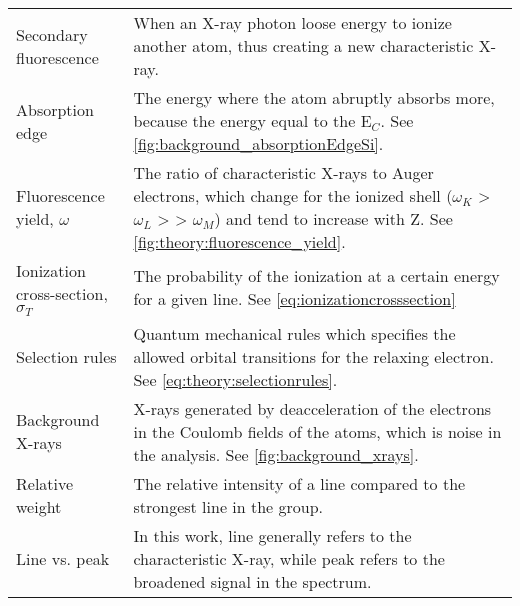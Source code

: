 \begin{table}[phb]
\begin{center}
\begin{tabular}{p{3cm}p{11.6cm}}
            Secondary fluorescence               & When an X-ray photon loose energy to ionize another atom, thus creating a new characteristic X-ray.                                                                                                         \\
            Absorption edge                      & The energy where the atom abruptly absorbs more, because the energy equal to the E$_C$.  See \cref{fig:background_absorptionEdgeSi}.                                                                        \\
            Fluorescence yield, $\omega$         & The ratio of characteristic X-rays to Auger electrons, which change for the ionized shell ($\omega_K$ > $\omega_L$ > > $\omega_M$) and tend to increase with Z.  See  \cref{fig:theory:fluorescence_yield}. \\
            Ionization cross-section, $\sigma_T$ & The probability of the ionization at a certain energy for a given line. See \cref{eq:ionizationcrosssection}                                                                                                \\
            Selection rules                      & Quantum mechanical rules which specifies the allowed orbital transitions for the relaxing electron. See \cref{eq:theory:selectionrules}.                                                                    \\
            Background X-rays                    & X-rays generated by deacceleration of the electrons in the Coulomb fields of the atoms, which is noise in the analysis. See \cref{fig:background_xrays}.                                                    \\
            Relative weight                      & The relative intensity of a line compared to the strongest line in the group.                                                                                                                               \\
            Line vs. peak                        & In this work, line generally refers to the characteristic X-ray, while peak refers to the broadened signal in the spectrum.                                                                                           \\
            \hline
        \end{tabular}
    \end{center}
\end{table}